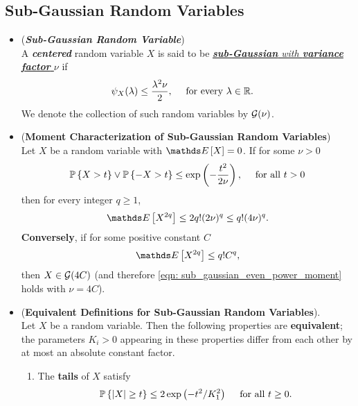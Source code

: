 \documentclass[11pt]{article}
\begin{document}
\subsection{Sub-Gaussian Random Variables}
\begin{itemize}
\item \begin{definition}(\textbf{\emph{Sub-Gaussian Random Variable}})\\
A \emph{\textbf{centered}} random variable $X$ is said to be \underline{\emph{\textbf{sub-Gaussian} with \textbf{variance factor} $\nu$}} if
\begin{align}
\psi_X(\lambda) &\le  \frac{\lambda^2 \nu}{2}, \quad \text{ for every }\lambda \in {\mathbb R}. \label{eqn: sub_gaussian_def_1}
\end{align} We denote the collection of such random variables by ${\mathcal G}(\nu)$.
\end{definition}

\item \begin{proposition} (\textbf{Moment Characterization of Sub-Gaussian Random Variables})  \citep{boucheron2013concentration}\\
Let $X$ be a random variable with $\E{}{X} = 0$. If for some $\nu > 0$
\begin{align}
{\mathbb P}\left\{X > t\right\} \lor  {\mathbb P}\left\{-X > t\right\} \le \exp\left(-\frac{t^2}{2\nu}\right), \quad \text{ for all } t > 0   \label{eqn: sub_gaussian_def_2}
\end{align}
then for every integer $q \ge 1$,
\begin{align}
\E{}{X^{2q}} \le 2q! (2\nu)^q \le q! (4\nu)^q. \label{eqn: sub_gaussian_even_power_moment}
\end{align}
\textbf{Conversely}, if for some positive constant $C$
\begin{align*}
\E{}{X^{2q}} \le  q! C^q,
\end{align*} then $X \in {\mathcal G}(4C)$ (and therefore \eqref{eqn: sub_gaussian_even_power_moment} holds with $\nu = 4C$).
\end{proposition}

\item \begin{proposition} (\textbf{Equivalent Definitions for Sub-Gaussian Random Variables}).  \citep{vershynin2018high}\\
Let $X$ be a random variable. Then the following properties are \textbf{equivalent}; the parameters $K_i > 0$ appearing in these
properties differ from each other by at most an absolute constant factor.
\begin{enumerate}
\item The \textbf{tails} of $X$ satisfy
\begin{align*}
{\mathbb P}\left\{\left\lvert X \right\rvert \ge t\right\} \le 2 \exp\left(-t^2/K_1^2\right)\quad\text{ for all }t \ge 0.
\end{align*}


\end{enumerate}
\end{proposition}
\end{itemize}
\end{document}
